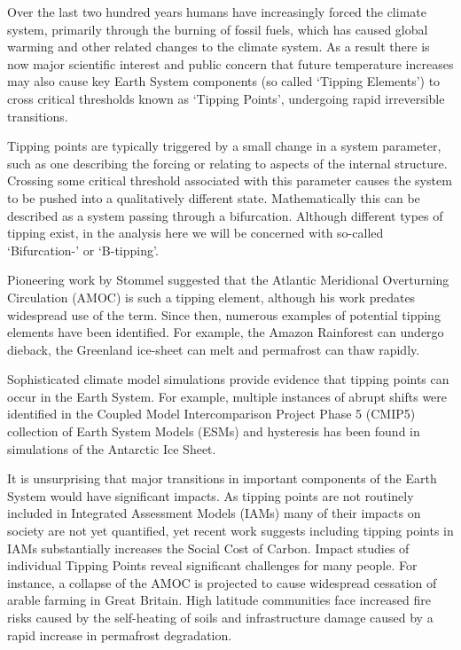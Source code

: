 Over the last two hundred years humans have increasingly forced the climate system, 
primarily through the burning of fossil fuels,
which has caused global warming and other related changes to the climate
system. As a result there is now major scientific interest and public 
concern\cite{Lenton2019a,Steffen2018,Ritchie2021} that future 
temperature increases may also cause key
Earth System components (so called `Tipping Elements')  to cross 
critical thresholds known as `Tipping Points', undergoing rapid 
irreversible transitions\cite{Lenton2008}. 

Tipping points are typically triggered by a small change in a system parameter, such as one describing the forcing or
relating to aspects of the internal structure. Crossing some critical threshold associated with this parameter causes the system to be pushed into a qualitatively 
different state. Mathematically this can be described as a system passing through a bifurcation. 
Although different types of tipping exist\cite{Ashwin2012}, in the analysis here 
we will be concerned with so-called `Bifurcation-' or `B-tipping'.


Pioneering work by Stommel suggested that the Atlantic Meridional Overturning 
Circulation (AMOC)\cite{STOMMEL1961} is such a tipping element, although
his work predates widespread use of the term. Since then,
numerous examples of potential tipping elements have been identified.
For example, the Amazon Rainforest can undergo dieback\cite{Cox2000}, the 
Greenland ice-sheet can melt\cite{Feldmann2015} and
permafrost can thaw rapidly\cite{Steffen2018}.

Sophisticated climate model simulations\cite{Rahmstorf1995} provide evidence that tipping points can occur
in the Earth System. For example, multiple
instances of abrupt shifts were identified in the Coupled Model Intercomparison Project Phase 5 (CMIP5)\cite{Taylor2012}
collection of Earth System Models (ESMs)\cite{Drijfhout2015} and hysteresis has been found in 
simulations of the Antarctic Ice Sheet\cite{Garbe2020}. 

It is unsurprising that major transitions in important components
of the Earth System would have significant impacts. As tipping points
are not routinely included in Integrated Assessment Models (IAMs) many of 
their impacts on society are not yet quantified, yet recent 
work\cite{Dietz2021}
suggests including tipping points in IAMs
substantially increases the Social Cost 
of Carbon. Impact studies of individual 
Tipping Points reveal significant challenges for many people. For instance, a 
collapse of the AMOC is projected to cause
widespread cessation of arable farming in Great Britain\cite{Ritchie2020a}.
High latitude communities face increased fire risks caused 
by the self-heating of soils\cite{Clarke2021} and infrastructure damage 
caused by a rapid increase in permafrost degradation\cite{Teufel2019}. 


